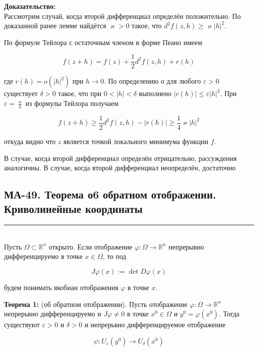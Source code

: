 \documentclass[a4paper,12pt]{article} %
\newcommand{\HRule}{\rule{\linewidth}{0.5mm}}
\begin{document}
\textbf{Доказательство:}\\
Рассмотрим случай, когда второй дифференциал определён положительно. По доказанной ранее лемме найдётся $\varkappa>0$ такое, что $d^{2} f(z, h) \geq \varkappa|h|^{2}$.

По формуле Тейлора с остаточным членом в форме Пеано имеем

$$
f(z+h)=f(z)+\frac{1}{2} d^{2} f(z, h)+r(h)
$$

где $r(h)=o\left(|h|^{2}\right)$ при $h \rightarrow 0$. По определению $о$ для любого $\varepsilon>0$ существует $\delta>0$ такое, что при $0<|h|<\delta$ выполнено $|r(h)| \leq \varepsilon|h|^{2}$. При $\varepsilon=\frac{\varkappa}{4}$ из формулы Тейлора получаем

$$
f(z+h) \geq \frac{1}{2} d^{2} f(z, h)-|r(h)| \geq \frac{1}{4} \varkappa|h|^{2}
$$

откуда видно что $z$ является точкой локального минимума функции $f$.

В случае, когда второй дифференциал определён отрицательно, рассуждения аналогичны. В случае, когда второй дифференциал неопределён, достаточно



\newpage
\begin{LARGE}
\begin{center}
	\section{МА-49. Теорема о6 обратном отображении. Криволинейные координаты}
\end{center}
\end{LARGE}
\HRule \\

Пусть $\Omega \subset \mathbb{R}^{n}$ открыто. Если отображение $\varphi: \Omega \rightarrow \mathbb{R}^{n}$ непрерывно дифференцируемо в точке $x \in \Omega$, то под

$$
J \varphi(x):=\operatorname{det} D \varphi(x)
$$

будем понимать якобиан отображения $\varphi$ в точке $x$.

\textbf{Теорема 1:} (об обратном отображении). Пусть отображение $\varphi: \Omega \rightarrow \mathbb{R}^{n}$ непрерьвно дифференцируемо и $J \varphi \neq 0$ в точке $x^{0} \in \Omega$ и $y^{0}=\varphi\left(x^{0}\right)$. Тогда существуют $\varepsilon>0$ и $\delta>0$ и непрерьвно дифференцируемое отображение

$$
\psi: U_{\varepsilon}\left(y^{0}\right) \rightarrow U_{\delta}\left(x^{0}\right)
$$
\end{document}
